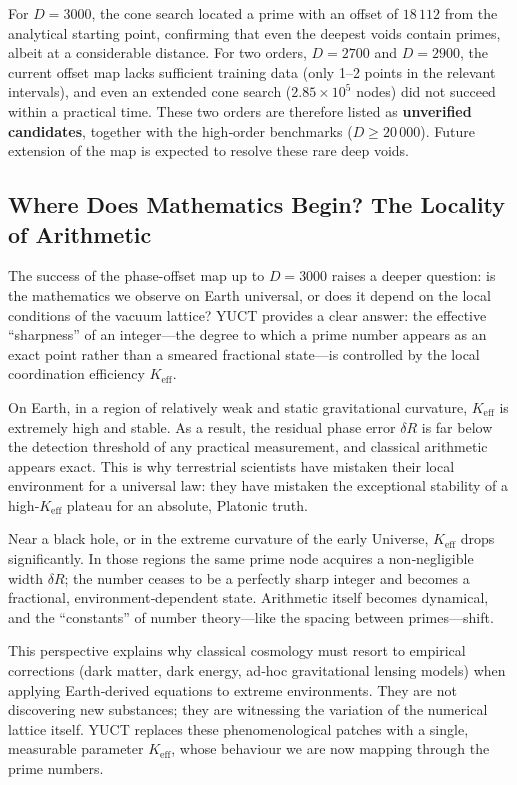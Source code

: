 \documentclass[12pt,a4paper]{article}
\theoremstyle{remark}
\begin{document}
For $D = 3000$, the cone search located a prime with an offset of $18\,112$ from the analytical starting point, confirming that even the deepest voids contain primes, albeit at a considerable distance. For two orders, $D = 2700$ and $D = 2900$, the current offset map lacks sufficient training data (only 1--2 points in the relevant intervals), and even an extended cone search ($2.85 \times 10^5$ nodes) did not succeed within a practical time. These two orders are therefore listed as \textbf{unverified candidates}, together with the high‑order benchmarks ($D \ge 20\,000$). Future extension of the map is expected to resolve these rare deep voids.

	\subsection{Where Does Mathematics Begin? The Locality of Arithmetic}
	
	The success of the phase-offset map up to $D = 3000$ raises a deeper question: is the mathematics we observe on Earth universal, or does it depend on the local conditions of the vacuum lattice? YUCT provides a clear answer: the effective ``sharpness'' of an integer---the degree to which a prime number appears as an exact point rather than a smeared fractional state---is controlled by the local coordination efficiency $K_{\mathrm{eff}}$. 
	
	On Earth, in a region of relatively weak and static gravitational curvature, $K_{\mathrm{eff}}$ is extremely high and stable. As a result, the residual phase error $\delta R$ is far below the detection threshold of any practical measurement, and classical arithmetic appears exact. This is why terrestrial scientists have mistaken their local environment for a universal law: they have mistaken the exceptional stability of a high‑$K_{\mathrm{eff}}$ plateau for an absolute, Platonic truth.
	
	Near a black hole, or in the extreme curvature of the early Universe, $K_{\mathrm{eff}}$ drops significantly. In those regions the same prime node acquires a non‑negligible width $\delta R$; the number ceases to be a perfectly sharp integer and becomes a fractional, environment‑dependent state. Arithmetic itself becomes dynamical, and the ``constants'' of number theory---like the spacing between primes---shift.
	
	This perspective explains why classical cosmology must resort to empirical corrections (dark matter, dark energy, ad‑hoc gravitational lensing models) when applying Earth‑derived equations to extreme environments. They are not discovering new substances; they are witnessing the variation of the numerical lattice itself. YUCT replaces these phenomenological patches with a single, measurable parameter $K_{\mathrm{eff}}$, whose behaviour we are now mapping through the prime numbers.
	
\end{document}
